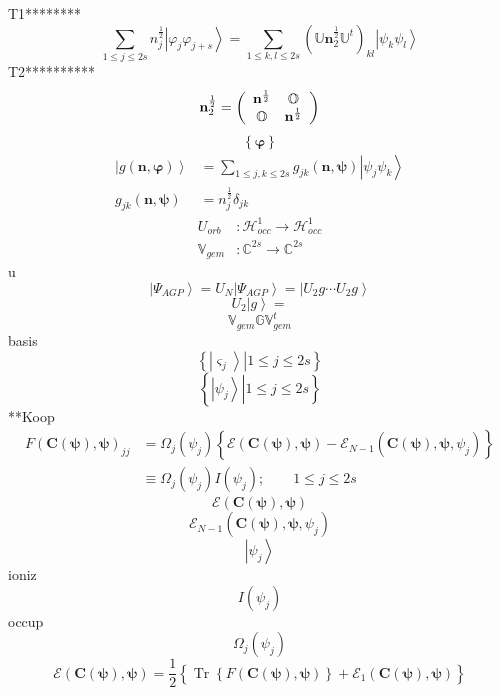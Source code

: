 \documentclass[aps,preprint]{revtex4}%
\begin{document}
T1********%
\[
\sum_{1\leq j\leq2s}n_{j}^{\frac{1}{2}}\left\vert \varphi_{j}\varphi
_{j+s}\right\rangle =\sum_{1\leq k,l\leq2s}\left(  \mathbb{U}\mathbf{n}%
_{2}^{\frac{1}{2}}\mathbb{U}^{t}\right)  _{kl}\left\vert \psi_{k}\psi
_{l}\right\rangle
\]
T2**********%
\[
\mathbf{n}_{2}^{\frac{1}{2}}=\left(
\begin{array}
[c]{cc}%
\mathbf{n}^{\frac{1}{2}} & \mathbb{O}\\
\mathbb{O} & \mathbf{n}^{\frac{1}{2}}%
\end{array}
\right)
\]%
\[
\left\{  \mathbf{\varphi}\right\}
\]%
\begin{align*}
\left\vert g\left(  \mathbf{n},\mathbf{\varphi}\right)  \right\rangle  &
=\sum_{1\leq j,k\leq2s}g_{jk}\left(  \mathbf{n},\mathbf{\psi}\right)
\left\vert \psi_{j}\psi_{k}\right\rangle \\
g_{jk}\left(  \mathbf{n},\mathbf{\psi}\right)   &  =n_{j}^{\frac{1}{2}}%
\delta_{jk}%
\end{align*}%
\begin{align*}
U_{orb}  &  :\mathcal{H}_{occ}^{1}\rightarrow\mathcal{H}_{occ}^{1}\\
\mathbb{V}_{gem}  &  :\mathbb{C}^{2s}\rightarrow\mathbb{C}^{2s}%
\end{align*}
u%
\[
\left\vert \Psi_{AGP}\right\rangle =U_{N}\left\vert \Psi_{AGP}\right\rangle
=\left\vert U_{2}g\cdots U_{2}g\right\rangle
\]%
\[
U_{2}\left\vert g\right\rangle =
\]%
\[
\mathbb{V}_{gem}\mathbb{GV}_{gem}^{t}%
\]
basis%
\[
\left\{  \left.  \left\vert \varsigma_{j}\right\rangle \right\vert 1\leq
j\leq2s\right\}
\]%
\[
\left\{  \left.  \left\vert \psi_{j}\right\rangle \right\vert 1\leq
j\leq2s\right\}
\]
**Koop%
\begin{align*}
F\left(  \mathbf{C}\left(  \mathbf{\psi}\right)  ,\mathbf{\psi}\right)  _{jj}
&  =\Omega_{j}\left(  \psi_{j}\right)  \left\{  \mathcal{E}\left(
\mathbf{C}\left(  \mathbf{\psi}\right)  ,\mathbf{\psi}\right)  -\mathcal{E}%
_{N-1}\left(  \mathbf{C}\left(  \mathbf{\psi}\right)  ,\mathbf{\psi,}\psi
_{j}\right)  \right\} \\
&  \equiv\Omega_{j}\left(  \psi_{j}\right)  I\left(  \psi_{j}\right)
;\qquad1\leq j\leq2s
\end{align*}%
\[
\mathcal{E}\left(  \mathbf{C}\left(  \mathbf{\psi}\right)  ,\mathbf{\psi
}\right)
\]%
\[
\mathcal{E}_{N-1}\left(  \mathbf{C}\left(  \mathbf{\psi}\right)
,\mathbf{\psi,}\psi_{j}\right)
\]%
\[
\left\vert \psi_{j}\right\rangle
\]
ioniz%
\[
I\left(  \psi_{j}\right)
\]
occup%
\[
\Omega_{j}\left(  \psi_{j}\right)
\]%
\[
\mathcal{E}\left(  \mathbf{C}\left(  \mathbf{\psi}\right)  ,\mathbf{\psi
}\right)  =\frac{1}{2}\left\{  \overset{}{\operatorname{Tr}\left\{  F\left(
\mathbf{C}\left(  \mathbf{\psi}\right)  ,\mathbf{\psi}\right)  \right\}
+\mathcal{E}_{1}\left(  \mathbf{C}\left(  \mathbf{\psi}\right)  ,\mathbf{\psi
}\right)  }\right\}
\]%
\end{document}
